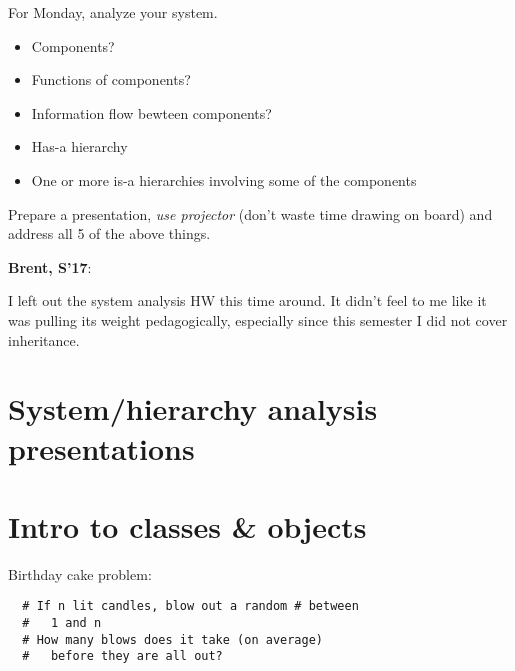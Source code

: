\documentclass{article}
\newenvironment{reflect}[1]
{
  \noindent
  \begin{lrbox}{\reflectbox}
    \begin{minipage}[t]{\textwidth}
      \textbf{#1}:
}{
    \end{minipage}
  \end{lrbox}
  \fbox{\usebox{\reflectbox}}
}
\begin{document}
For Monday, analyze your system.
\begin{itemize}
\item Components?
\item Functions of components?
\item Information flow bewteen components?
\item Has-a hierarchy
\item One or more is-a hierarchies involving some of the components
\end{itemize}

Prepare a presentation, \emph{use projector} (don't waste time drawing
on board) and address all 5 of the above things.

\begin{reflect}{Brent, S'17}
  I left out the system analysis HW this time around.  It didn't feel
  to me like it was pulling its weight pedagogically, especially since
  this semester I did not cover inheritance.
\end{reflect}

\section{System/hierarchy analysis presentations}

\newpage
\section{Intro to classes \& objects}

Birthday cake problem:
\begin{verbatim}
  # If n lit candles, blow out a random # between
  #   1 and n
  # How many blows does it take (on average)
  #   before they are all out?
\end{verbatim}
\end{document}
